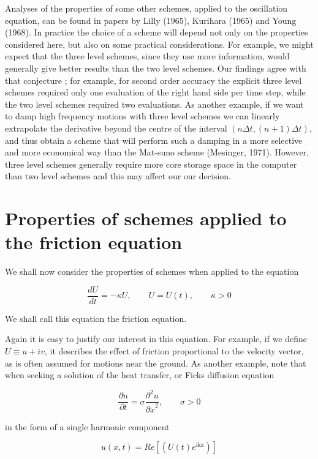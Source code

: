 Analyses of the properties of some other schemes, applied to the
oscillation equation, can be found in papers by Lilly (1965), Kurihara
(1965) and Young (1968). In practice the choice of a scheme will depend
not only on the properties considered here, but also on some practical
considerations. For example, we might expect that the three level
schemes, since they use more information, would generally give better
results than the two level schemes. Our findings agree with that
conjecture ; for example, for second order accuracy the explicit three
level schemes required only one evaluation of the right hand side per
time step, while the two level schemes required two evaluations. As
another example, if we want to damp high frequency motions with three
level schemes we can linearly extrapolate the derivative beyond the
centre of the interval
\(\left( n\Delta t,\left( n + 1 \right)\Delta t \right)\), and thus
obtain a scheme that will perform such a damping in a more selective and
more economical way than the Mat-suno scheme (Mesinger, 1971). However,
three level schemes generally require more core storage space in the
computer than two level schemes and this may affect our our decision.

\section{Properties of schemes applied to the friction equation}
\label{sec:properties-of-schemes-applied-to-the-friction-equation}

We shall now consider the properties of schemes when applied to the
equation

\[\frac{d U}{d t} = - \kappa U, \qquad U = U\left( t \right), \qquad \kappa > 0\]

We shall call this equation the friction equation.

Again it is easy to justify our interest in this equation. For example,
if we define \(U \equiv u + iv\), it describes the effect of friction
proportional to the velocity vector, as is often assumed for motions
near the ground. As another example, note that when seeking a solution
of the heat transfer, or Fick\textquotesingle s diffusion equation

\[\frac{\partial u}{\partial t} = \sigma\frac{\partial^{2} u }{{\partial x}^{2}}, \qquad \sigma > 0\]

in the form of a single harmonic component

\[u\left( x,t \right) = Re\left\lbrack \left( U\left( t \right)e^{\text{ikx}} \right) \right\rbrack\]

